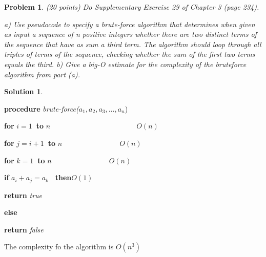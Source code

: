 \documentclass{article}
\newtheorem{problem}[theorem]{Problem}
\newtheorem{solution}[theorem]{Solution}
\begin{document}
\begin{problem}
(20 points)\newline
Do Supplementary Exercise 29 of Chapter 3 (page 234).

a) Use pseudocode to specify a brute-force algorithm that determines when
given as input a sequence of n positive integers whether there are two
distinct terms of the sequence that have as sum a third term. The algorithm
should loop through all triples of terms of the sequence, checking whether
the sum of the first two terms equals the third. b) Give a big-O estimate
for the complexity of the bruteforce algorithm from part (a).
\end{problem}

\begin{solution}
\end{solution}

\qquad \qquad \qquad \textbf{procedure }\textit{brute-force(}$%
a_{1},a_{2},a_{3},...,a_{n}$)

\qquad \qquad \textbf{\qquad for }$i=1$\textbf{\ to }$n\qquad \qquad \qquad
\qquad \qquad \qquad O(n)$

\textbf{\qquad \qquad \qquad \qquad for }$j=i+1$\textbf{\ to }$n\qquad
\qquad \qquad \qquad O(n)$

\textbf{\qquad \qquad \qquad \qquad \qquad for }$k=1$\textbf{\ to }$n\qquad
\qquad \qquad \qquad O(n)$

\textbf{\qquad \qquad \qquad \qquad \qquad \qquad if }$a_{i}+a_{j}=a_{k}$%
\textbf{\ then\qquad \qquad }$O(1)$

\textbf{\qquad \qquad \qquad \qquad \qquad \qquad \qquad return }\textit{true%
}

\textbf{\qquad \qquad \qquad \qquad \qquad \qquad else}

\textbf{\qquad \qquad \qquad \qquad \qquad \qquad return }\textit{false}

\qquad \qquad \qquad The complexity fo the algorithm is $O(n^{3})$
\end{document}
